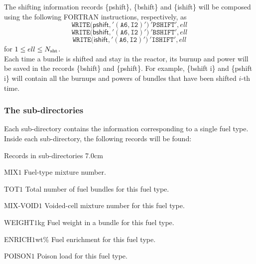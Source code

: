 The shifting information records \{pshift\}, \{bshift\} and \{ishift\}
will be composed using the following FORTRAN instructions, respectively, as 
  \begin{displaymath}
    \mathtt{WRITE(}\mathsf{pshift}\mathtt{,'(A6,I2)')} \ 
   \mathtt{'PSHIFT'},ell
  \end{displaymath}
  \begin{displaymath}
    \mathtt{WRITE(}\mathsf{bshift}\mathtt{,'(A6,I2)')} \ 
   \mathtt{'BSHIFT'},ell
  \end{displaymath}
  \begin{displaymath}
    \mathtt{WRITE(}\mathsf{ishift}\mathtt{,'(A6,I2)')} \ 
   \mathtt{'ISHIFT'},ell
  \end{displaymath}
for $1\leq ell \leq N_{\rm sht}$. \\

Each time a bundle is shifted and stay in the reactor, its burnup and power will be saved
in the records \{bshift\} and \{pshift\}. For example, \{bshift i\} and \{pshift i\} will
contain all the burnups and powers of bundles that have been shifted $i$-th time.

\subsubsection{The  sub-directories}\label{sect:dirfuel}

Each \moc{FUEL} sub-directory contains the information corresponding
to a single fuel type. Inside each sub-directory, the following records
will be found:

\begin{DescriptionEnregistrement}{Records in \moc{FUEL} sub-directories}
{7.0cm} \label{tabl:tabfuel}

\IntEnr
 {MIX}{$1$} {Fuel-type mixture number.}

\IntEnr
 {TOT\blank{9}}{$1$} {Total number of fuel bundles for this fuel type.}

\IntEnr
 {MIX-VOID\blank{4}}{$1$} {Voided-cell mixture number for this fuel type.}

\RealEnr
{WEIGHT}{$1$}{kg}
{Fuel weight in a bundle for this fuel type.}

\RealEnr
{ENRICH}{$1$}{wt\%}
{Fuel enrichment for this fuel type.}

\RealEnr
{POISON\blank{6}}{$1$}{}
{Poison load for this fuel type.}

\end{DescriptionEnregistrement}


